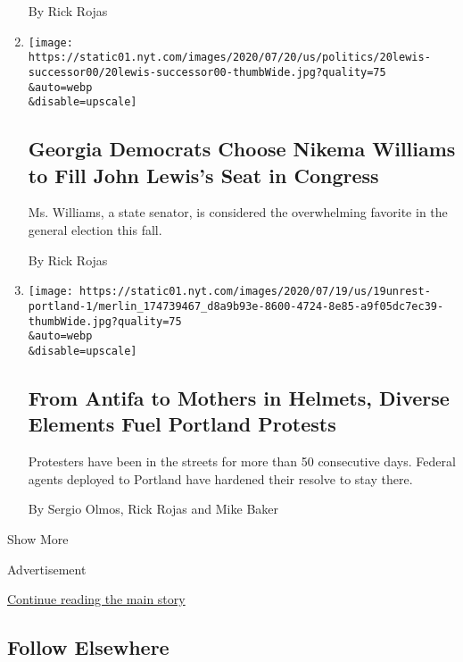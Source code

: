 \begin{enumerate}
  By Rick Rojas
\item
  \href{/2020/07/20/us/politics/john-lewis-successor-congress.html}{}

  \texttt{[image: https://static01.nyt.com/images/2020/07/20/us/politics/20lewis-successor00/20lewis-successor00-thumbWide.jpg?quality=75\\\&auto=webp\\\&disable=upscale]}

  \hypertarget{georgia-democrats-choose-nikema-williams-to-fill-john-lewiss-seat-in-congress}{%
  \subsection{Georgia Democrats Choose Nikema Williams to Fill John
  Lewis's Seat in
  Congress}\label{georgia-democrats-choose-nikema-williams-to-fill-john-lewiss-seat-in-congress}}

  Ms. Williams, a state senator, is considered the overwhelming favorite
  in the general election this fall.

  By Rick Rojas
\item
  \href{/2020/07/19/us/portland-protests.html}{}

  \texttt{[image: https://static01.nyt.com/images/2020/07/19/us/19unrest-portland-1/merlin\_174739467\_d8a9b93e-8600-4724-8e85-a9f05dc7ec39-thumbWide.jpg?quality=75\\\&auto=webp\\\&disable=upscale]}

  \hypertarget{from-antifa-to-mothers-in-helmets-diverse-elements-fuel-portland-protests}{%
  \subsection{From Antifa to Mothers in Helmets, Diverse Elements Fuel
  Portland
  Protests}\label{from-antifa-to-mothers-in-helmets-diverse-elements-fuel-portland-protests}}

  Protesters have been in the streets for more than 50 consecutive days.
  Federal agents deployed to Portland have hardened their resolve to
  stay there.

  By Sergio Olmos, Rick Rojas and Mike Baker
\end{enumerate}

Show More

Advertisement

\protect\hyperlink{after-mid2}{Continue reading the main story}

\hypertarget{follow-elsewhere}{%
\subsection{Follow Elsewhere}\label{follow-elsewhere}}

